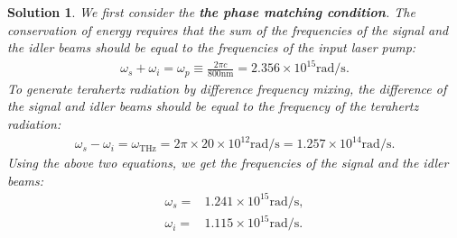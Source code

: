 \documentclass[UTF8,10pt,a4paper]{article}
\theoremstyle{Problem}
\theoremstyle{Solution}
\newtheorem*{sol}{Solution}
\begin{document}
\begin{sol}

    We first consider the \textbf{the phase matching condition}. The conservation of energy requires that the sum of the frequencies of the signal and the idler beams should be equal to the frequencies of the input laser pump:
    \begin{align}
        \omega_s+\omega_i=\omega_p\equiv\frac{2\pi c}{800\text{nm}}=2.356\times 10^{15}\text{rad}/\text{s}.
    \end{align}
    To generate terahertz radiation by difference frequency mixing, the difference of the signal and idler beams should be equal to the frequency of the terahertz radiation:
    \begin{align}
        \omega_s-\omega_i=\omega_{\text{THz}}=2\pi\times 20\times 10^{12}\text{rad}/\text{s}=1.257\times 10^{14}\text{rad}/\text{s}.
    \end{align}
    Using the above two equations, we get the frequencies of the signal and the idler beams:
    \begin{align}
        \omega_s=&1.241\times 10^{15}\text{rad}/\text{s},\\
        \omega_i=&1.115\times 10^{15}\text{rad}/\text{s}.
    \end{align}


\end{sol}
\end{document}
